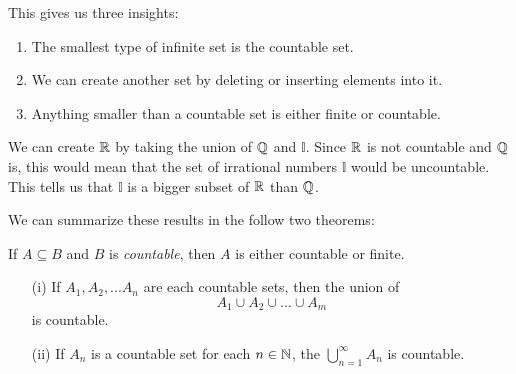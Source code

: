 This gives us three insights: 

\begin{enumerate}
    \item The smallest type of infinite set is the countable set.
    \item We can create another set by deleting or inserting elements into it. 
    \item Anything smaller than a countable set is either finite or countable. 
\end{enumerate}

We can create \( \mathbb{R} \) by taking the union of \( \mathbb{Q} \) and \( \mathbb{I} \). Since \( \mathbb{R} \) is not countable and \( \mathbb{Q} \) is, this would mean that the set of irrational numbers \( \mathbb{I}\) would be uncountable. This tells us that \( \mathbb{I}\) is a bigger subset of \( \mathbb{R} \) than \( \mathbb{Q} \). 

We can summarize these results in the follow two theorems: 


\begin{theorem}
    If \( A \subseteq B \) and \( B \) is \textit{countable}, then \( A \) is either countable or finite. 
\end{theorem}

\begin{theorem}
\begin{enumerate}
    \item[(i)] If \( A_1, A_2,... A_n\) are each countable sets, then the union of 
        \[ A_1 \cup A_2 \cup ... \cup A_m \] is countable.
    \item[(ii)] If \( A_n \) is a countable set for each \( n \in \mathbb{N} \), the \( \bigcup_{n=1}^{\infty}A_n \) is countable. 
\end{enumerate}
\end{theorem}








